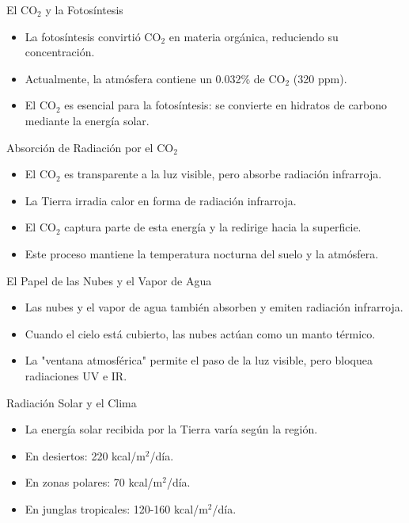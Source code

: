 \documentclass[main.tex]{subfiles}
\begin{document}
\begin{frame}{El CO$_2$ y la Fotosíntesis}
    \begin{itemize}
        \item La fotosíntesis convirtió CO$_2$ en materia orgánica, reduciendo su concentración.
        \item Actualmente, la atmósfera contiene un 0.032\% de CO$_2$ (320 ppm).
        \item El CO$_2$ es esencial para la fotosíntesis: se convierte en hidratos de carbono mediante la energía solar.
    \end{itemize}
\end{frame}

\begin{frame}{Absorción de Radiación por el CO$_2$}
    \begin{itemize}
        \item El CO$_2$ es transparente a la luz visible, pero absorbe radiación infrarroja.
        \item La Tierra irradia calor en forma de radiación infrarroja.
        \item El CO$_2$ captura parte de esta energía y la redirige hacia la superficie.
        \item Este proceso mantiene la temperatura nocturna del suelo y la atmósfera.
    \end{itemize}
\end{frame}

\begin{frame}{El Papel de las Nubes y el Vapor de Agua}
    \begin{itemize}
        \item Las nubes y el vapor de agua también absorben y emiten radiación infrarroja.
        \item Cuando el cielo está cubierto, las nubes actúan como un manto térmico.
        \item La "ventana atmosférica" permite el paso de la luz visible, pero bloquea radiaciones UV e IR.
    \end{itemize}
\end{frame}

\begin{frame}{Radiación Solar y el Clima}
    \begin{itemize}
        \item La energía solar recibida por la Tierra varía según la región.
        \item En desiertos: 220 kcal/m$^2$/día.
        \item En zonas polares: 70 kcal/m$^2$/día.
        \item En junglas tropicales: 120-160 kcal/m$^2$/día.
    \end{itemize}
\end{frame}
\end{document}
